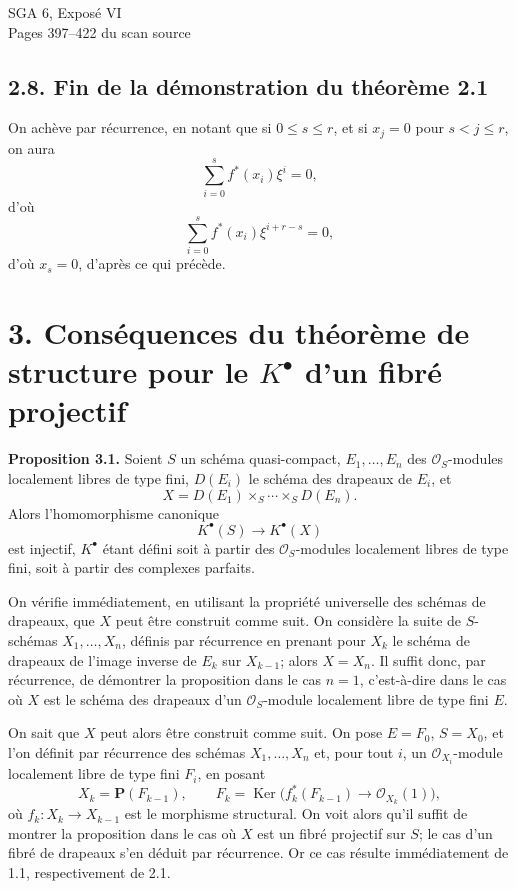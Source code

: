 \documentclass[11pt]{article}
\providecommand{\Ker}{\operatorname{Ker}}
\begin{document}
\begin{center}
{\Large SGA 6, Exposé VI}\\[0.3em]
{\large Pages 397--422 du scan source}
\end{center}

\subsection*{2.8. Fin de la démonstration du théorème 2.1}
On achève par récurrence, en notant que si \(0\leq s\leq r\), et si \(x_j=0\) pour \(s<j\leq r\), on aura
\[
  \sum_{i=0}^{s} f^*(x_i)\xi^i=0,
\]
d'où
\[
  \sum_{i=0}^{s} f^*(x_i)\xi^{i+r-s}=0,
\]
d'où \(x_s=0\), d'après ce qui précède.

\section*{3. Conséquences du théorème de structure pour le \(K^\bullet\) d'un fibré projectif}

\textbf{Proposition 3.1.} Soient \(S\) un schéma quasi-compact, \(E_1,\ldots,E_n\) des \(\mathcal O_S\)-modules localement libres de type fini, \(D(E_i)\) le schéma des drapeaux de \(E_i\), et
\[
  X=D(E_1)\times_S\cdots\times_S D(E_n).
\]
Alors l'homomorphisme canonique
\[
  K^\bullet(S)\longrightarrow K^\bullet(X)
\]
est injectif, \(K^\bullet\) étant défini soit à partir des \(\mathcal O_S\)-modules localement libres de type fini, soit à partir des complexes parfaits.

On vérifie immédiatement, en utilisant la propriété universelle des schémas de drapeaux, que \(X\) peut être construit comme suit. On considère la suite de \(S\)-schémas \(X_1,\ldots,X_n\), définis par récurrence en prenant pour \(X_k\) le schéma de drapeaux de l'image inverse de \(E_k\) sur \(X_{k-1}\); alors \(X=X_n\). Il suffit donc, par récurrence, de démontrer la proposition dans le cas \(n=1\), c'est-à-dire dans le cas où \(X\) est le schéma des drapeaux d'un \(\mathcal O_S\)-module localement libre de type fini \(E\).

On sait que \(X\) peut alors être construit comme suit. On pose \(E=F_0\), \(S=X_0\), et l'on définit par récurrence des schémas \(X_1,\ldots,X_n\) et, pour tout \(i\), un \(\mathcal O_{X_i}\)-module localement libre de type fini \(F_i\), en posant
\[
  X_k=\mathbf P(F_{k-1}),\qquad
  F_k=\Ker\bigl(f_k^*(F_{k-1})\longrightarrow\mathcal O_{X_k}(1)\bigr),
\]
où \(f_k:X_k\to X_{k-1}\) est le morphisme structural. On voit alors qu'il suffit de montrer la proposition dans le cas où \(X\) est un fibré projectif sur \(S\); le cas d'un fibré de drapeaux s'en déduit par récurrence. Or ce cas résulte immédiatement de 1.1, respectivement de 2.1.
\end{document}
